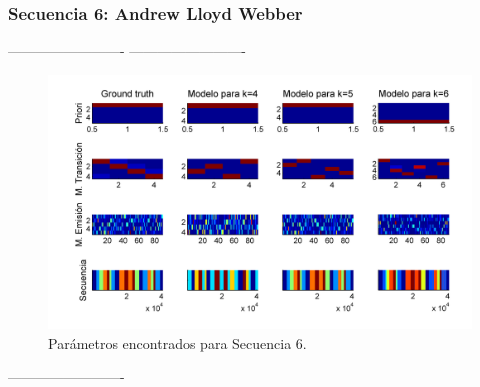 \newpage
\subsubsection{Secuencia 6: Andrew Lloyd Webber}

-------------------------
-------------------------

\begin{figure}[H]
  \centerline
  {\includegraphics[width=1.3\linewidth]{gfx/chap6/cats1}} \quad
  \caption{Parámetros encontrados para Secuencia 6.}
  \label{fig:prb1_par}
\end{figure}

-------------------------

